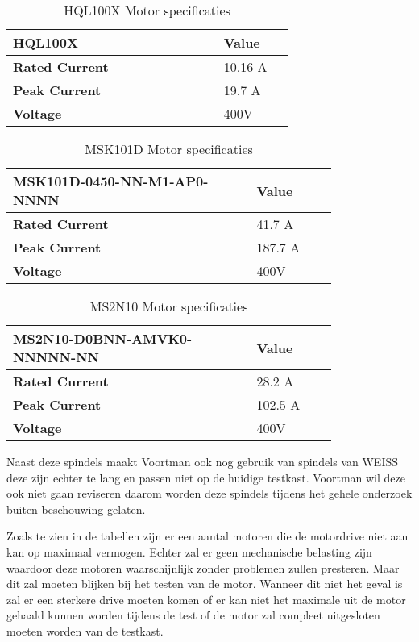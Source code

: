 \begin{table}[H]
	\caption{HQL100X Motor specificaties}
	\label{tab:HQL100X}
	\centering
	\begin{tabular}{|p{0.6\linewidth}|p{0.2\linewidth}|}
		\hline
		\textbf{HQL100X} & \textbf{Value} \\
		\hline
		\textbf{Rated Current} & 10.16 \gls{A} \\
		\textbf{Peak Current} & 19.7 \gls{A} \\
		\textbf{Voltage} & 400\gls{V} \\
		\hline
	\end{tabular}
\end{table}

\begin{table}[H]
	\caption{MSK101D Motor specificaties}
	\label{tab:HQL100X}
	\centering
	\begin{tabular}{|p{0.6\linewidth}|p{0.2\linewidth}|}
		\hline
		\textbf{MSK101D-0450-NN-M1-AP0-NNNN} & \textbf{Value} \\
		\hline
		\textbf{Rated Current} & 41.7 \gls{A} \\
		\textbf{Peak Current} & 187.7 \gls{A} \\
		\textbf{Voltage} & 400\gls{V} \\
		\hline
	\end{tabular}
\end{table}

\begin{table}[H]
	\caption{MS2N10 Motor specificaties}
	\label{tab:HQL100X}
	\centering
	\begin{tabular}{|p{0.6\linewidth}|p{0.2\linewidth}|}
		\hline
		\textbf{MS2N10-D0BNN-AMVK0-NNNNN-NN} & \textbf{Value} \\
		\hline
		\textbf{Rated Current} & 28.2 \gls{A} \\
		\textbf{Peak Current} & 102.5 \gls{A} \\
		\textbf{Voltage} & 400\gls{V} \\
		\hline
	\end{tabular}
\end{table}


Naast deze spindels maakt Voortman ook nog gebruik van spindels van WEISS deze zijn echter te lang en passen niet op de huidige testkast. Voortman wil deze ook niet gaan reviseren daarom worden deze spindels tijdens het gehele onderzoek buiten beschouwing gelaten.

\vspace{0.5cm}

Zoals te zien in de tabellen zijn er een aantal motoren die de motordrive niet aan kan op maximaal vermogen. Echter zal er geen mechanische belasting zijn waardoor deze motoren waarschijnlijk zonder problemen zullen presteren. Maar dit zal moeten blijken bij het testen van de motor. Wanneer dit niet het geval is zal er een sterkere drive moeten komen of er kan niet het maximale uit de motor gehaald kunnen worden tijdens de test of de motor zal compleet uitgesloten moeten worden van de testkast.
